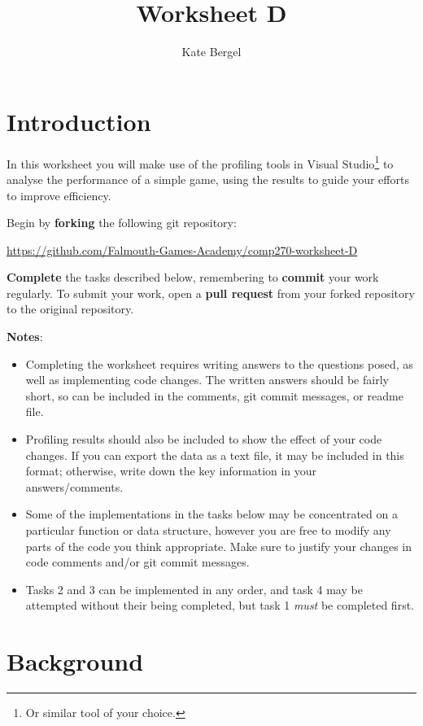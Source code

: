 \documentclass{../../../fal_assignment}
\title{Worksheet D}
\author{Kate Bergel}
\begin{document}
\maketitle

\section*{Introduction}

In this worksheet you will make use of the profiling tools in Visual Studio\footnote{Or similar tool of your choice.} to analyse the performance of a simple game, using the results to guide your efforts to improve efficiency.

Begin by \textbf{forking} the following git repository:

\begin{center}
	\url{https://github.com/Falmouth-Games-Academy/comp270-worksheet-D}
\end{center}

\textbf{Complete} the tasks described below, remembering to \textbf{commit} your work regularly.
To submit your work, open a \textbf{pull request} from your forked repository to the original repository.

\textbf{Notes}:
\begin{itemize}
	\item Completing the worksheet requires writing answers to the questions posed, as well as implementing code changes. The written answers should be fairly short, so can be included in the comments, git commit messages, or readme file.
	\item Profiling results should also be included to show the effect of your code changes. If you can export the data as a text file, it may be included in this format; otherwise, write down the key information in your answers/comments.
	\item Some of the implementations in the tasks below may be concentrated on a particular function or data structure, however you are free to modify any parts of the code you think appropriate. Make sure to justify your changes in code comments and/or git commit messages.
	\item Tasks 2 and 3 can be implemented in any order, and task 4 may be attempted without their being completed, but task 1 \textit{must} be completed first.
\end{itemize}

\section*{Background}
\end{document}
